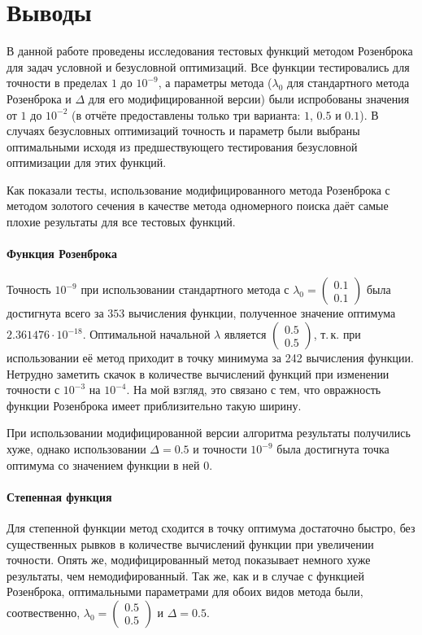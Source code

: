\documentclass[a4paper,12pt,notitlepage,pdftex,headsepline]{scrartcl}
\begin{document}
  \clearpage
\section{Выводы}
  В данной работе проведены исследования тестовых функций методом Розенброка
  для задач условной и безусловной оптимизаций.
  Все функции тестировались для точности в пределах $1$ до $10^{-9}$, а
  параметры метода ($\lambda_0$ для стандартного метода Розенброка и $\Delta$
  для его модифицированной версии) были испробованы значения от $1$ до
  $10^{-2}$ (в отчёте предоставлены только три варианта: $1$, $0.5$ и $0.1$).
  В случаях безусловных оптимизаций точность и параметр были выбраны
  оптимальными исходя из предшествующего тестирования безусловной оптимизации
  для этих функций.

  Как показали тесты, использование модифицированного метода Розенброка с
  методом золотого сечения в качестве метода одномерного поиска даёт самые
  плохие результаты для все тестовых функций.

  \paragraph{Функция Розенброка}
    Точность $10^{-9}$ при использовании стандартного метода с $\lambda_0 =
    \left(\begin{matrix} 0.1\\ 0.1\end{matrix} \right)$ была достигнута всего за
    $353$ вычисления функции, полученное значение оптимума $2.361476\cdot
    10^{-18}$.
    Оптимальной начальной $\lambda$ является $\left(\begin{matrix} 0.5 \\ 0.5
    \end{matrix}\right)$, т.\,к. при использовании её метод приходит в точку
    минимума за 242 вычисления функции.
    Нетрудно заметить скачок в количестве вычислений функций при изменении
    точности с $10^{-3}$ на $10^{-4}$.
    На мой взгляд, это связано с тем, что овражность функции Розенброка имеет
    приблизительно такую ширину.

    При использовании модифицированной версии алгоритма результаты получились
    хуже, однако использовании $\Delta = 0.5$ и точности $10^{-9}$ была
    достигнута точка оптимума со значением функции в ней $0$.

  \paragraph{Степенная функция}
    Для степенной функции метод сходится в точку оптимума достаточно быстро,
    без существенных рывков в количестве вычислений функции при увеличении
    точности.
    Опять же, модифицированный метод показывает немного хуже результаты, чем
    немодифированный.
    Так же, как и в случае с функцией Розенброка, оптимальными параметрами для
    обоих видов метода были, соотвественно, $\lambda_0 = \left(\begin{matrix}
      0.5\\ 0.5\end{matrix}\right)$ и $\Delta = 0.5$.
\end{document}
